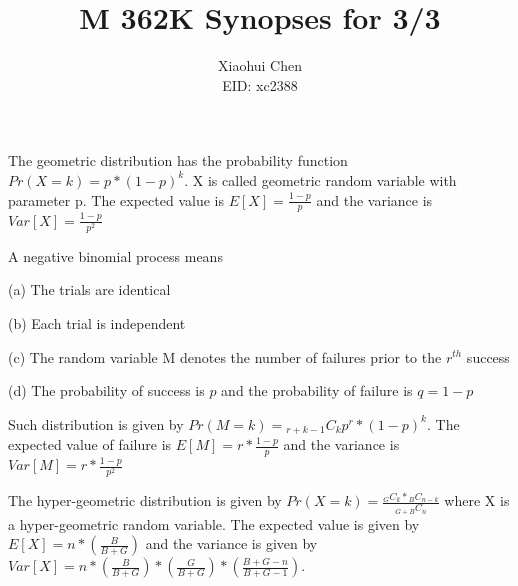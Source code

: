 \documentclass[12pt]{article}
\author{Xiaohui Chen \\EID: xc2388}
\title{M 362K Synopses for 3/3}
\begin{document}
\maketitle
\begin{spacing}{2.0}

The geometric distribution has the probability function $Pr(X=k)= p*(1-p)^k$. X is called geometric random variable with parameter p. The expected value is $E[X]= \frac{1-p}{p}$ and the variance is $Var[X]= \frac{1-p}{p^2}$

A negative binomial process means

(a) The trials are identical

(b) Each trial is independent

(c) The random variable M denotes the number of failures prior to the $r^{th}$ success

(d) The probability of success is $p$ and the probability of failure is $q=1-p$

Such distribution is given by $Pr(M=k)={}_{r+k-1}C_{k} p^r*(1-p)^k$. The expected value of failure is $E[M]= r*\frac{1-p}{p}$ and the variance is $Var[M]= r*\frac{1-p}{p^2}$

The hyper-geometric distribution is given by $Pr(X=k)= \frac{{}_{G}C_{k}*{}_{B}C_{n-k}}{{}_{G+B}C_{n}}$ where X is a hyper-geometric random variable. The expected value is given by $E[X]= n*\left( \frac{B}{B+G} \right)$ and the variance is given by $Var[X]= n*\left( \frac{B}{B+G} \right)*\left( \frac{G}{B+G} \right)*\left( \frac{B+G-n}{B+G-1} \right)$.

\end{spacing}
\end{document}
